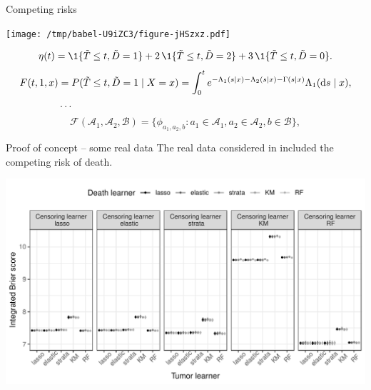 \documentclass[smaller]{beamer}\usepackage{listings}
\begin{document}
\begin{frame}[label={sec:org23c9e3b}]{Competing risks}
\small

\begin{center}
\texttt{[image: /tmp/babel-U9iZC3/figure-jHSzxz.pdf]}
\end{center}

\begin{equation*}
  \eta(t) = \1{\{\tilde{T} \leq t, \tilde{D} = 1\}} +
  2 \, \1{\{\tilde{T} \leq t, \tilde{D} = 2\}}
  +
  3 \, \1{\{\tilde{T} \leq t, \tilde{D} = 0\}}.
\end{equation*}
\begin{align*}
  F(t, 1, x)
  & = P(\tilde{T} \leq t, \tilde{D}=1 \mid X=x)
    = \int_0^t e^{-\Lambda_1(s \mid x) -\Lambda_2(s \mid x) - \Gamma(s \mid x) }  \Lambda_1(\mathop{}\!\mathrm{d} s \mid x),
  \\
  & \dots
\end{align*}
\begin{equation*}
  \mathcal{F}(\mathcal{A}_1,\mathcal{A}_2, \mathcal{B})
  = \{ \phi_{a_1, a_2, b} : a_1 \in \mathcal{A}_1, a_2 \in \mathcal{A}_2, b \in \mathcal{B}\},
\end{equation*}
\end{frame}

\begin{frame}[label={sec:org0d0c7dc}]{Proof of concept -- some real data}
\small The real data considered in \citep{kattan2000pretreatment} included the
competing risk of death.

\begin{center}
\includegraphics[width=1\textwidth]{./zelefski-real-data.pdf}
\end{center}
\end{frame}
\end{document}
